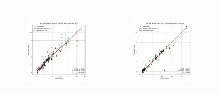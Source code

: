 \begin{figure}
{\begin{tabular}{cc}
\begin{subfigure}{0.5\textwidth}
            \end{subfigure} \\
            \begin{subfigure}{0.5\textwidth}
                \includegraphics[width=\textwidth]{images/one_to_one/elasticnet/MgO.png}
            \end{subfigure} & \hspace{3cm}
            \begin{subfigure}{0.5\textwidth}
                \includegraphics[width=\textwidth]{images/one_to_one/elasticnet/CaO.png}

\end{subfigure}
\end{tabular}}
\end{figure}
